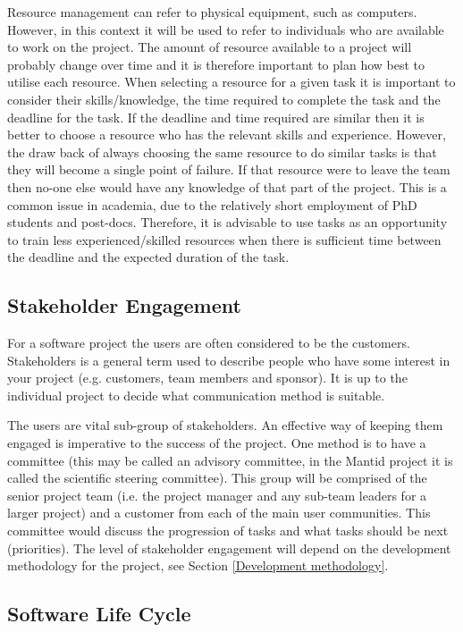 \documentclass[jnr]{iosart2x}
\begin{document}
Resource management can refer to physical equipment, such as computers.
However, in this context it will be used to refer to individuals who are available to work on the project.
The amount of resource available to a project will probably change over time and it is therefore important to plan how best to utilise each resource.
When selecting a resource for a given task it is important to consider their skills/knowledge, the time required to complete the task and the deadline for the task.
If the deadline and time required are similar then it is better to choose a resource who has the relevant skills and experience.
However, the draw back of always choosing the same resource to do similar tasks is that they will become a single point of failure.
If that resource were to leave the team then no-one else would have any knowledge of that part of the project.
This is a common  issue in academia, due to the relatively short employment of PhD students and post-docs.
Therefore, it is advisable to use tasks as an opportunity to train less experienced/skilled resources when there is sufficient time between the deadline and the expected duration of the task.

\subsection{Stakeholder Engagement}
\label{se}

For a software project the users are often considered to be the customers. 
Stakeholders is a general term used to describe people who have some interest in your project (e.g. customers, team members and sponsor).
It is up to the individual project to decide what communication method is suitable.

The users are vital sub-group of stakeholders.
An effective way of keeping them engaged is imperative to the success of the project.
One method is to have a committee (this may be called an advisory committee, in the Mantid project it is called the scientific steering committee).
This group will be comprised of the senior project team (i.e. the project manager and any sub-team leaders for a larger project) and a customer from each of the main user communities.
This committee would discuss the progression of tasks and what tasks should be next (priorities).
The level of stakeholder engagement will depend on the development methodology for the project, see Section \ref{Development methodology}.


\subsection{Software Life Cycle}
\label{lc}
\end{document}
